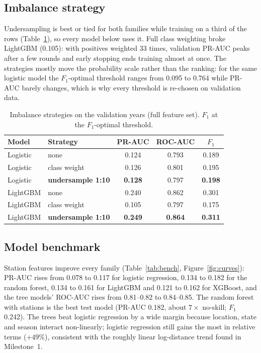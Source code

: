 \documentclass[10pt,twocolumn,letterpaper]{article}
\begin{document}
\subsection{Imbalance strategy}
Undersampling is best or tied for both families while training on a third of the rows (Table~\ref{tab:imbalance}), so every model below uses it. Full class weighting broke LightGBM (0.105): with positives weighted 33 times, validation PR-AUC peaks after a few rounds and early stopping ends training almost at once. The strategies mostly move the probability scale rather than the ranking: for the same logistic model the $F_1$-optimal threshold ranges from 0.095 to 0.764 while PR-AUC barely changes, which is why every threshold is re-chosen on validation data.

\begin{table}[!htb]
\centering\small
\caption{Imbalance strategies on the validation years (full feature set). $F_1$ at the $F_1$-optimal threshold.}
\label{tab:imbalance}
\begin{tabular}{@{}llccc@{}}
\toprule
Model & Strategy & PR-AUC & ROC-AUC & $F_1$ \\
\midrule
Logistic & none & 0.124 & 0.793 & 0.189 \\
Logistic & class weight & 0.126 & 0.801 & 0.195 \\
Logistic & \textbf{undersample 1:10} & \textbf{0.128} & 0.797 & \textbf{0.198} \\
\midrule
LightGBM & none & 0.240 & 0.862 & 0.301 \\
LightGBM & class weight & 0.105 & 0.797 & 0.175 \\
LightGBM & \textbf{undersample 1:10} & \textbf{0.249} & \textbf{0.864} & \textbf{0.311} \\
\bottomrule
\end{tabular}
\end{table}

\subsection{Model benchmark}
Station features improve every family (Table~\ref{tab:bench}, Figure~\ref{fig:curves}): PR-AUC rises from 0.078 to 0.117 for logistic regression, 0.134 to 0.182 for the random forest, 0.134 to 0.161 for LightGBM and 0.121 to 0.162 for XGBoost, and the tree models' ROC-AUC rises from 0.81--0.82 to 0.84--0.85. The random forest with stations is the best test model (PR-AUC 0.182, about $7\times$ no-skill; $F_1$ 0.242). The trees beat logistic regression by a wide margin because location, state and season interact non-linearly; logistic regression still gains the most in relative terms (+49\%), consistent with the roughly linear log-distance trend found in Milestone~1.
\end{document}
